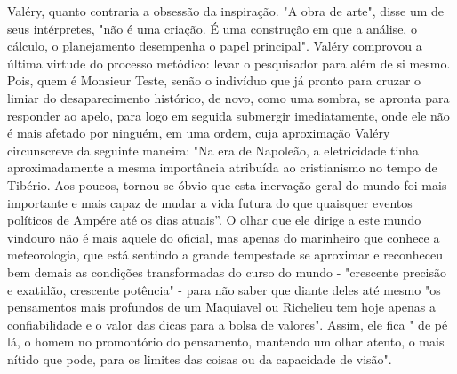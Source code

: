 Valéry, quanto contraria a obsessão da inspiração. "A obra de arte",
disse um de seus intérpretes, "não é uma criação. É uma construção em
que a análise, o cálculo, o planejamento desempenha o papel principal".
Valéry comprovou a última virtude do processo metódico: levar o
pesquisador para além de si mesmo. Pois, quem é Monsieur Teste, senão o
indivíduo que já pronto para cruzar o limiar do desaparecimento
histórico, de novo, como uma sombra, se apronta para responder ao apelo,
para logo em seguida submergir imediatamente, onde ele não é mais
afetado por ninguém, em uma ordem, cuja aproximação Valéry circunscreve
da seguinte maneira: "Na era de Napoleão, a eletricidade tinha
aproximadamente a mesma importância atribuída ao cristianismo no tempo
de Tibério. Aos poucos, tornou-se óbvio que esta inervação geral do
mundo foi mais importante e mais capaz de mudar a vida futura do que
quaisquer eventos políticos de Ampére até os dias atuais''. O olhar que
ele dirige a este mundo vindouro não é mais aquele do oficial, mas
apenas do marinheiro que conhece a meteorologia, que está sentindo a
grande tempestade se aproximar e reconheceu bem demais as condições
transformadas do curso do mundo - "crescente precisão e exatidão,
crescente potência" - para não saber que diante deles até mesmo "os
pensamentos mais profundos de um Maquiavel ou Richelieu tem hoje apenas
a confiabilidade e o valor das dicas para a bolsa de valores". Assim,
ele fica " de pé lá, o homem no promontório do pensamento, mantendo um
olhar atento, o mais nítido que pode, para os limites das coisas ou da
capacidade de visão".
